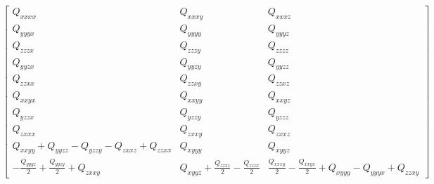 \documentclass[fleqn,8pt,landscape]{jsarticle}
\begin{document}
\begin{align*}
\begin{bmatrix} Q_{xxxx} & Q_{xxxy} & Q_{xxxz} \\ Q_{yyyx} & Q_{yyyy} & Q_{yyyz} \\ Q_{zzzx} & Q_{zzzy} & Q_{zzzz} \\ Q_{yyzx} & Q_{yyzy} & Q_{yyzz} \\ Q_{zzxx} & Q_{zzxy} & Q_{zzxz} \\ Q_{xxyx} & Q_{xxyy} & Q_{xxyz} \\ Q_{yzzx} & Q_{yzzy} & Q_{yzzz} \\ Q_{zxxx} & Q_{zxxy} & Q_{zxxz} \\ Q_{xxyy} + Q_{yyzz} - Q_{yzzy} - Q_{zxxz} + Q_{zzxx} & Q_{xyyy} & Q_{xyyz} \\ - \frac{Q_{yyyz}}{2} + \frac{Q_{yyzy}}{2} + Q_{zxxy} & Q_{xyyz} + \frac{Q_{zzxz}}{2} - \frac{Q_{zzzx}}{2} & \frac{Q_{xxxy}}{2} - \frac{Q_{xxyx}}{2} + Q_{xyyy} - Q_{yyyx} + Q_{zzxy} \end{bmatrix}
\end{align*}
\end{document}
